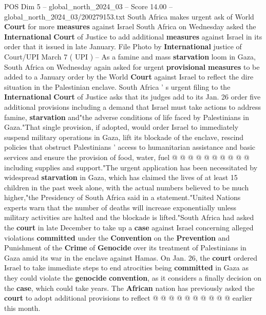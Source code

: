 \begin{textsample}{POS Dim 5 – global\_north\_2024\_03 – Score 14.00 – global\_north\_2024\_03/200279153.txt}  \label{ex:f5_pos_370}
South Africa makes urgent ask of World \textbf{Court} for more \textbf{measures} against Israel South Africa on Wednesday asked the \textbf{International} \textbf{Court} of Justice to add additional \textbf{measures} against Israel in its order that it issued in late January.
File Photo by \textbf{International} justice of Court/UPI March 7 ( UPI ) -- As a famine and mass \textbf{starvation} loom in Gaza, South Africa on Wednesday again asked for urgent \textbf{provisional} \textbf{measures} to be added to a January order by the World \textbf{Court} against Israel to reflect the dire situation in the Palestinian enclave.
South Africa ' s urgent filing to the \textbf{International} \textbf{Court} of Justice asks that its judges add to its Jan. 26 order five additional provisions including a demand that Israel must take actions to address famine, \textbf{starvation} and"the adverse conditions of life faced by Palestinians in Gaza."That single provision, if adopted, would order Israel to immediately suspend military operations in Gaza, lift its blockade of the enclave, rescind policies that obstruct Palestinians ' access to humanitarian assistance and basic services and ensure the provision of food, water, fuel @ @ @ @ @ @ @ @ @ @ including supplies and support."The urgent application has been necessitated by widespread \textbf{starvation} in Gaza, which has claimed the lives of at least 15 children in the past week alone, with the actual numbers believed to be much higher,"the Presidency of South Africa said in a statement."United Nations experts warn that the number of deaths will increase exponentially unless military activities are halted and the blockade is lifted."South Africa had asked the \textbf{court} in late December to take up a \textbf{case} against Israel concerning alleged violations \textbf{committed} under the \textbf{Convention} on the \textbf{Prevention} and Punishment of the \textbf{Crime} of \textbf{Genocide} over its treatment of Palestinians in Gaza amid its war in the enclave against Hamas.
On Jan. 26, the \textbf{court} ordered Israel to take immediate steps to end atrocities being \textbf{committed} in Gaza as they could violate the \textbf{genocide} \textbf{convention}, as it considers a finally decision on the \textbf{case}, which could take years.
The \textbf{African} nation has previously asked the \textbf{court} to adopt additional provisions to reflect @ @ @ @ @ @ @ @ @ @ earlier this month.

\end{textsample}

